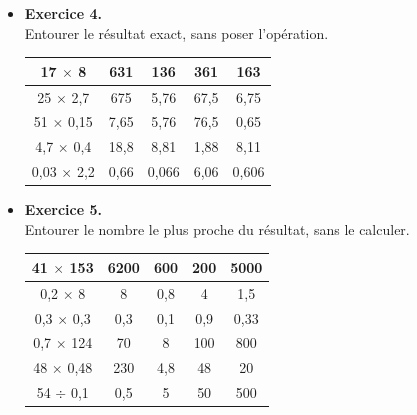\begin{exercice}
\begin{center}
{\begin{minipage}{16cm}
\begin{itemize}
   Combiner quatre fois le nombre  \fg{} avec des signes arithmétiques, pour obtenir le nombre indiqué.
   \begin{center}
    ;  ;  ;  ;  ;  ;  ; . 
   \end{center}
   \medskip
   \item {\bf Exercice 4.} \\
   Entourer le résultat exact, sans poser l'opération.
   \medskip
   \begin{center}
   {\renewcommand{\arraystretch}{1.3}
   \begin{tabular}{|c|c|c|c|c|}
      \hline
      17 $\times$ 8 & 631 & 136 & 361 & 163 \\
      \hline
      25 $\times$ 2,7 & 675 & 5,76 & 67,5 & 6,75 \\
      \hline
      51 $\times$ 0,15 & 7,65 & 5,76 & 76,5 & 0,65 \\
      \hline
      4,7 $\times$ 0,4 & 18,8 & 8,81 & 1,88 & 8,11 \\
      \hline
      0,03 $\times$ 2,2 & 0,66 & 0,066 & 6,06 & 0,606 \\
      \hline
   \end{tabular}}
   \end{center}
   \medskip
   \item {\bf Exercice 5.} \\
   Entourer le nombre le plus proche du résultat, sans le calculer.
   \medskip
   \begin{center}
   {\renewcommand{\arraystretch}{1.3}
   \begin{tabular}{|c|c|c|c|c|}
      \hline
      41 $\times$ 153 & 6200 & 600 & 200 & 5000 \\
      \hline
      0,2 $\times$ 8 & 8 & 0,8 & 4 & 1,5 \\
      \hline
      0,3 $\times$ 0,3 & 0,3 & 0,1 & 0,9 & 0,33 \\
      \hline
      0,7 $\times$ 124 & 70 & 8 & 100 & 800 \\
      \hline
      48 $\times$ 0,48 & 230 & 4,8 & 48 & 20 \\
      \hline
      54 $\div$ 0,1 & 0,5 & 5 & 50 & 500 \\
      \hline
   \end{tabular}}
   \smallskip
   \end{center}
\end{itemize}
\end{minipage}}

\end{center}
\end{exercice}
